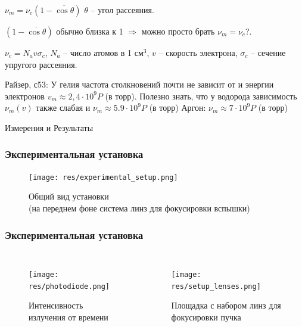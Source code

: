 \documentclass{beamer}
\begin{document}
	\begin{frame}
		$\nu_m = \nu_c (1 - \overline{\cos{\theta}})$
		$\theta$ -- угол рассеяния.
		
		$(1 - \overline{\cos{\theta}})$ обычно близка к 1 $\Rightarrow$ можно просто брать $\nu_m = \nu_c$?.
		
		$\nu_c = N_a v \sigma_c$, $N_a$ -- число атомов в 1 см$^3$, $v$ -- скорость электрона, $\sigma_c$ -- сечение упругого рассеяния.
		
		Райзер, с53: У гелия частота столкновений почти не зависит от и энергии электронов $v_m \approx 2,4\cdot 10^9 P$ (в торр). Полезно знать, что у водорода зависимость $\nu_m (v)$ также слабая и $\nu_m \approx 5.9 \cdot 10^9 P$ (в торр)
		Аргон: $\nu_m \approx 7 \cdot 10^9 P$ (в торр)
	\end{frame}
	
	\begin{frame}[plain,c]
		
		\begin{center}
			\huge {} Измерения и Результаты
		\end{center}
		
	\end{frame}
	
	
	\begin{frame}
		\frametitle{Экспериментальная установка}
		\begin{figure}
			\centering
			\texttt{[image: res/experimental\_setup.png]}
			\caption*{Общий вид установки\\ \footnotesize (на переднем фоне система линз для фокусировки вспышки) }
		\end{figure}
	\end{frame}
	
	\begin{frame}
		\frametitle{Экспериментальная установка}
		\begin{columns}
			\column{0.5\linewidth}
			\begin{figure}
				\centering
				\texttt{[image: res/photodiode.png]}
				\caption*{Интенсивность излучения от времени}
			\end{figure}	
			\column{0.5\linewidth}
			\begin{figure}
				\centering
				\texttt{[image: res/setup\_lenses.png]}
				\caption*{Площадка с набором линз для фокусировки пучка}
			\end{figure}
		\end{columns}
	\end{frame}	
	
\end{document}
